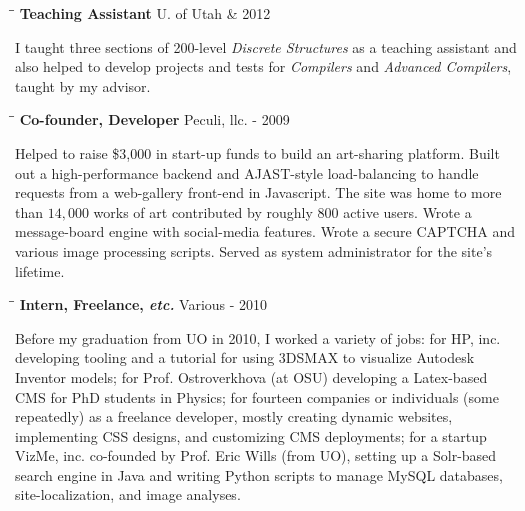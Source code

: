 \documentclass[line]{res}
\begin{document}
\begin{resume}
   \vspace{-0.2cm}  
   \begin{tabbing}
    \hspace{2.25in}\= \hspace{2.25in}\= \kill %
    {\bf Teaching Assistant} \>U. of Utah      \& 2012
   \end{tabbing}\vspace{-0.5cm}      %
    I taught three sections of 200-level \textit{Discrete Structures} as a teaching assistant and also helped to develop projects and tests for \textit{Compilers} and \textit{Advanced Compilers}, taught by my advisor.
   \vspace{-0.2cm}  
   \begin{tabbing}
    \hspace{2.25in}\= \hspace{2.25in}\= \kill %
    {\bf Co-founder, Developer} \>Peculi, llc.     - 2009
   \end{tabbing}\vspace{-0.5cm}      %
   Helped to raise \$3,000 in start-up funds to build an art-sharing platform. Built out a high-performance backend and AJAST-style
   load-balancing to handle requests from a web-gallery front-end in Javascript. The site was home to more than $14,000$ works of art contributed
   by roughly $800$ active users. Wrote a message-board engine with social-media features. Wrote a secure CAPTCHA and various image processing
   scripts. Served as system administrator for the site's lifetime.
   \vspace{-0.2cm}  
   \begin{tabbing}
    \hspace{2.25in}\= \hspace{2.25in}\= \kill %
    {\bf Intern, Freelance, \textit{etc.}} \>Various      - 2010
   \end{tabbing}\vspace{-0.5cm}      %
    Before my graduation from UO in 2010, I worked a variety of jobs: for HP, inc. developing tooling and a tutorial for using 3DSMAX to visualize Autodesk Inventor models; for Prof. Ostroverkhova (at OSU) developing a Latex-based CMS for PhD students in Physics; for fourteen companies or individuals (some repeatedly) as a freelance developer, mostly creating dynamic websites, implementing CSS designs, and customizing CMS deployments; for a startup VizMe, inc. co-founded by Prof. Eric Wills (from UO), setting up a Solr-based search engine in Java and writing Python scripts to manage MySQL databases, site-localization, and image analyses.
    

\end{resume}
\end{document}
